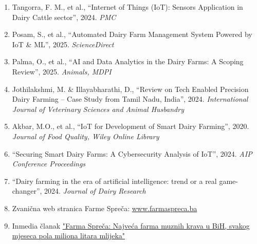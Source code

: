 \documentclass{article}
\begin{document}
\begin{enumerate}
\item Tangorra, F. M., et al., “Internet of Things (IoT): Sensors Application in Dairy Cattle sector”, 2024. \textit{PMC}
 \item Posam, S., et al., “Automated Dairy Farm Management System Powered by IoT \& ML”, 2025. \textit{ScienceDirect}
 \item Palma, O., et al., “AI and Data Analytics in the Dairy Farms: A Scoping Review”, 2025. \textit{Animals, MDPI}
 \item Jothilakshmi, M. \& Illayabharathi, D., “Review on Tech Enabled Precision Dairy Farming – Case Study from Tamil Nadu, India”, 2024. \textit{International Journal of Veterinary Sciences and Animal Husbandry}
 \item Akbar, M.O., et al., “IoT for Development of Smart Dairy Farming”, 2020. \textit{Journal of Food Quality, Wiley Online Library}
 \item “Securing Smart Dairy Farms: A Cybersecurity Analysis of IoT”, 2024. \textit{AIP Conference Proceedings}
 \item “Dairy farming in the era of artificial intelligence: trend or a real game-changer”, 2024. \textit{Journal of Dairy Research}
 \item Zvanična web stranica Farme Spreča: \href{https://farmaspreca.ba/}{www.farmaspreca.ba}
 \item Inmedia članak \href{https://www.inmedia.ba/farma-spreca-najveca-farma-muznih-krava-u-bih-svakog-mjeseca-pola-miliona-litara-mlijeka/}{"Farma Spreča: Najveća farma muznih krava u BiH, svakog mjeseca pola miliona litara mlijeka"}
\end{enumerate}

\newpage
\end{document}
